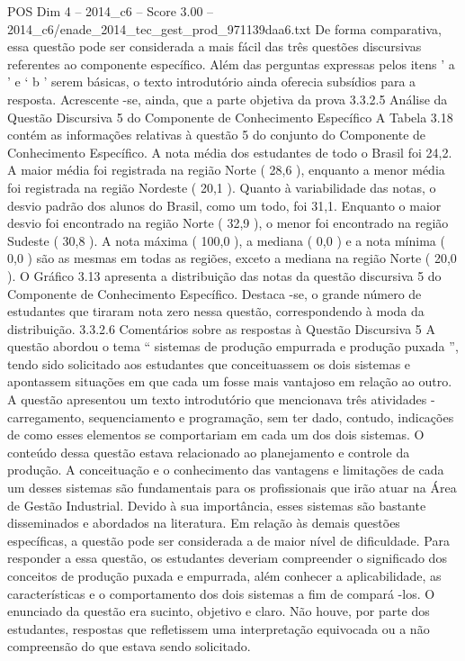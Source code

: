 \begin{textsample}{POS Dim 4 – 2014\_c6 – Score 3.00 – 2014\_c6/enade\_2014\_tec\_gest\_prod\_971139daa6.txt}
De forma comparativa, essa questão pode ser considerada a mais fácil das três questões discursivas referentes ao componente específico.
Além das perguntas expressas pelos itens ’ a ’ e ‘ b ’ serem básicas, o texto introdutório ainda oferecia subsídios para a resposta.
Acrescente -se, ainda, que a parte objetiva da prova 3.3.2.5 Análise da Questão Discursiva 5 do Componente de Conhecimento Específico A Tabela 3.18 contém as informações relativas à questão 5 do conjunto do Componente de Conhecimento Específico.
A nota média dos estudantes de todo o Brasil foi 24,2.
A maior média foi registrada na região Norte ( 28,6 ), enquanto a menor média foi registrada na região Nordeste ( 20,1 ).
Quanto à variabilidade das notas, o desvio padrão dos alunos do Brasil, como um todo, foi 31,1.
Enquanto o maior desvio foi encontrado na região Norte ( 32,9 ), o menor foi encontrado na região Sudeste ( 30,8 ).
A nota máxima ( 100,0 ), a mediana ( 0,0 ) e a nota mínima ( 0,0 ) são as mesmas em todas as regiões, exceto a mediana na região Norte ( 20,0 ).
O Gráfico 3.13 apresenta a distribuição das notas da questão discursiva 5 do Componente de Conhecimento Específico.
Destaca -se, o grande número de estudantes que tiraram nota zero nessa questão, correspondendo à moda da distribuição. 3.3.2.6 Comentários sobre as respostas à Questão Discursiva 5 A questão abordou o tema “ sistemas de produção empurrada e produção puxada ”, tendo sido solicitado aos estudantes que conceituassem os dois sistemas e apontassem situações em que cada um fosse mais vantajoso em relação ao outro.
A questão apresentou um texto introdutório que mencionava três atividades - carregamento, sequenciamento e programação, sem ter dado, contudo, indicações de como esses elementos se comportariam em cada um dos dois sistemas.
O conteúdo dessa questão estava relacionado ao planejamento e controle da produção.
A conceituação e o conhecimento das vantagens e limitações de cada um desses sistemas são fundamentais para os profissionais que irão atuar na Área de Gestão Industrial.
Devido à sua importância, esses sistemas são bastante disseminados e abordados na literatura.
Em relação às demais questões específicas, a questão pode ser considerada a de maior nível de dificuldade.
Para responder a essa questão, os estudantes deveriam compreender o significado dos conceitos de produção puxada e empurrada, além conhecer a aplicabilidade, as características e o comportamento dos dois sistemas a fim de compará -los.
O enunciado da questão era sucinto, objetivo e claro.
Não houve, por parte dos estudantes, respostas que refletissem uma interpretação equivocada ou a não compreensão do que estava sendo solicitado.

\end{textsample}
